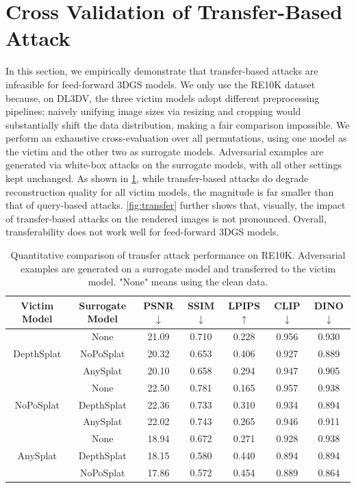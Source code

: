 \section{Cross Validation of Transfer-Based Attack}
In this section, we empirically demonstrate that transfer-based attacks are infeasible for feed-forward 3DGS models. We only use the RE10K dataset because, on DL3DV, the three victim models adopt different preprocessing pipelines; naively unifying image sizes via resizing and cropping would substantially shift the data distribution, making a fair comparison impossible. We perform an exhaustive cross-evaluation over all permutations, \ie using one model as the victim and the other two as surrogate models. Adversarial examples are generated via white-box attacks on the surrogate models, with all other settings kept unchanged. As shown in \cref{tab:transfer_attack}, while transfer-based attacks do degrade reconstruction quality for all victim models, the magnitude is far smaller than that of query-based attacks. \cref{fig:transfer} further shows that, visually, the impact of transfer-based attacks on the rendered images is not pronounced. Overall, transferability does not work well for feed-forward 3DGS models.

\begin{table}[h]
\centering
\caption{Quantitative comparison of transfer attack performance on RE10K. Adversarial examples are generated on a surrogate model and transferred to the victim model. "None" means using the clean data.}
\label{tab:transfer_attack}
\begin{tabular}{cc ccccc}
\toprule
Victim Model & Surrogate Model & \cellcolor{gray!20}PSNR $\downarrow$ & \cellcolor{gray!20}SSIM $\downarrow$ & \cellcolor{gray!20}LPIPS $\uparrow$ & \cellcolor{gray!20}CLIP $\downarrow$ & \cellcolor{gray!20}DINO $\downarrow$ \\
\midrule
\multirow{3}{*}{DepthSplat} & None       & 21.09 & 0.710 & 0.228 & 0.956 & 0.930 \\
                            & NoPoSplat  & 20.32 & 0.653 & 0.406 & 0.927 & 0.889 \\
                            & AnySplat   & 20.10 & 0.658 & 0.294 & 0.947 & 0.905 \\
\midrule
\multirow{3}{*}{NoPoSplat}  & None       & 22.50 & 0.781 & 0.165 & 0.957 & 0.938 \\
                            & DepthSplat & 22.36 & 0.733 & 0.310 & 0.934 & 0.894 \\
                            & AnySplat   & 22.02 & 0.743 & 0.265 & 0.946 & 0.911 \\
\midrule
\multirow{3}{*}{AnySplat}   & None       & 18.94 & 0.672 & 0.271 & 0.928 & 0.938 \\
                            & DepthSplat & 18.15 & 0.580 & 0.440 & 0.894 & 0.894 \\
                            & NoPoSplat  & 17.86 & 0.572 & 0.454 & 0.889 & 0.864 \\
\bottomrule
\end{tabular}%
\end{table}

